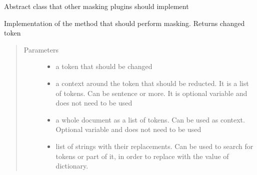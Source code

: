 \documentclass[letterpaper,10pt,english]{sphinxmanual}
\begin{document}
\begin{fulllineitems}
\label{\detokenize{index:masking_plugins.Mask_abstract.Mask_abstract}}
Abstract class that other masking plugins should implement

\begin{fulllineitems}
\label{\detokenize{index:masking_plugins.Mask_abstract.Mask_abstract.mask}}
Implementation of the method that should perform masking. Returns changed token
\begin{quote}\begin{description}
\item[{Parameters}] \leavevmode\begin{itemize}
\item {} 
 \textendash{} a token that should be changed

\item {} 
 \textendash{} a context around the token that should be reducted. It is a list of tokens. Can be sentence or more. It is optional variable and does not need to be used

\item {} 
 \textendash{} a whole document as a list of tokens. Can be used as context. Optional variable and does not need to be used

\item {} 
 \textendash{} list of strings with their replacements. Can be used to search for tokens or part of it, in order to replace with the value of dictionary.

\end{itemize}

\end{description}\end{quote}

\end{fulllineitems}


\end{fulllineitems}
\end{document}
